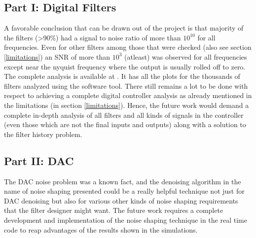 \documentclass[colorlinks=true,pdfstartview=FitV,linkcolor=blue,
            citecolor=red,urlcolor=magenta]{ligodoc}
\begin{document}
 \subsection{Part I: Digital Filters} A favorable conclusion that can be drawn out of the project is that majority of the filters (>90\%) had a signal to noise ratio of more than $10^{10}$ for all frequencies. Even for other filters among those that were checked (also see section \ref{limitations}) an SNR of more than $10^3$ (atleast) was observed for all frequencies except near the nyquist frequency where the output is usually rolled off to zero.\\
	The complete analysis is available at \cite{Collection}. It has all the plots for the thousands of filters analyzed using the software tool.
There still remains a lot to be done with respect to achieving a complete digital controller analysis as already mentioned in the limitations (in section \ref{limitations}). Hence, the future work would demand a complete in-depth analysis of all filters and all kinds of signals in the controller (even those which are not the final inputs and outputs) along with a solution to the filter history problem. 
	\subsection{Part II: DAC} The DAC noise problem was a known fact, and the denoising algorithm in the name of noise shaping presented could be a really helpful technique not just for DAC denoising but also for various other kinds of noise shaping requirements that the filter designer might want. The future work requires a complete development and implementation of the noise shaping technique in the real time code to reap advantages of the results shown in the simulations. 
    

\end{document}
